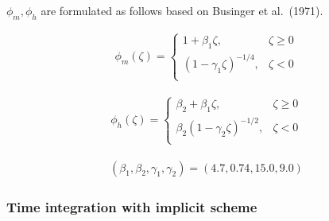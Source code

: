 \(\phi_m,\phi_h\) are formulated as follows based on Businger et
al.~(1971).

\begin{eqnarray}
\phi_m(\zeta)=\left\{
    \begin{array}{lr}
      1+\beta_1\zeta, &\zeta\ge 0\\
      \left(1-\gamma_1\zeta\right)^{-1/4}, &\zeta< 0\\
    \end{array}
  \right.
\end{eqnarray}

\begin{eqnarray}
\phi_h(\zeta)=\left\{
    \begin{array}{lr}
      \beta_2+\beta_1\zeta, &\zeta\ge 0\\
      \beta_2\left(1-\gamma_2\zeta\right)^{-1/2}, &\zeta< 0\\
    \end{array}
  \right.
\end{eqnarray}

\begin{eqnarray}(\beta_1,\beta_2,\gamma_1,\gamma_2)=(4.7,0.74,15.0,9.0)\end{eqnarray}

\hypertarget{time-integration-with-implicit-scheme}{%
\subsubsection{Time integration with implicit
scheme}\label{time-integration-with-implicit-scheme}}
